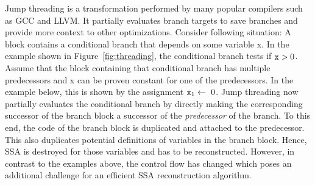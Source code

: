 Jump threading is a transformation performed by many popular compilers such as GCC and LLVM.
It partially evaluates branch targets to save branches and provide more context to other optimizations.
Consider following situation:
A block contains a conditional branch that depends on some variable \var x.
In the example shown in Figure~\ref{fig:threading}, the conditional branch tests if $\mathtt{x}> 0$.
Assume that the block containing that conditional branch has multiple predecessors and \var x can be proven constant for one of the predecessors.
In the example below, this is shown by the assignment $\mathtt{x}_1\gets~0$. 
Jump threading now partially evaluates the conditional branch by directly making the corresponding successor of the branch block a successor of the \emph{predecessor} of the branch.
To this end, the code of the branch block is duplicated and attached to the predecessor. 
This also duplicates potential definitions of variables in the branch block.
Hence, SSA is destroyed for those variables and has to be reconstructed. 
However, in contrast to the examples above, the control flow has changed which poses an additional challenge for an efficient SSA reconstruction algorithm. 
